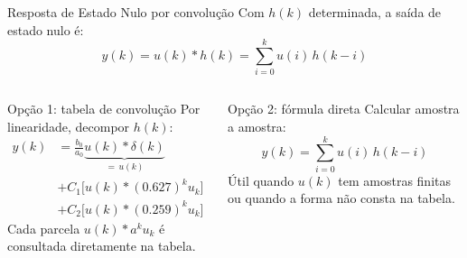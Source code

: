 \begin{frame}{}
  \scriptsize
  \begin{block}{Resposta de Estado Nulo por convolução}
    Com $h(k)$ determinada, a saída de estado nulo é:
    $$y(k)=u(k)*h(k)=\sum_{i=0}^{k}u(i)\,h(k-i)$$
  \end{block}
  \begin{columns}[t]
    \begin{block}{Opção 1: tabela de convolução}
      Por linearidade, decompor $h(k)$:
      \begin{align*}
        y(k)
         & =\tfrac{b_0}{a_0}\underbrace{u(k)*\delta(k)}_{=\,u(k)} \\
         & +C_1\bigl[u(k)*(0.627)^k u_k\bigr]                     \\
         & +C_2\bigl[u(k)*(0.259)^k u_k\bigr]
      \end{align*}
      Cada parcela $u(k)*a^k u_k$ é consultada diretamente na tabela.
    \end{block}
    \begin{block}{Opção 2: fórmula direta}
      Calcular amostra a amostra:
      $$y(k)=\sum_{i=0}^{k}u(i)\,h(k-i)$$
      Útil quando $u(k)$ tem amostras finitas ou quando a forma não consta na tabela.
    \end{block}
  \end{columns}
\end{frame}
